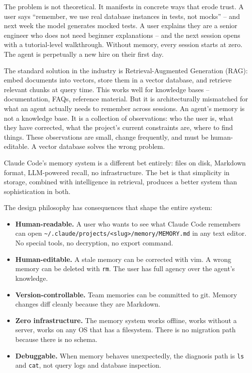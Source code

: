 \documentclass[
  english,
  11pt,
  letterpaper,
]{book}
\providecommand{\tightlist}{%
  \setlength{\itemsep}{0pt}\setlength{\parskip}{0pt}}
\begin{document}
The problem is not theoretical. It manifests in concrete ways that erode
trust. A user says ``remember, we use real database instances in tests,
not mocks'' -- and next week the model generates mocked tests. A user
explains they are a senior engineer who does not need beginner
explanations -- and the next session opens with a tutorial-level
walkthrough. Without memory, every session starts at zero. The agent is
perpetually a new hire on their first day.

The standard solution in the industry is Retrieval-Augmented Generation
(RAG): embed documents into vectors, store them in a vector database,
and retrieve relevant chunks at query time. This works well for
knowledge bases -- documentation, FAQs, reference material. But it is
architecturally mismatched for what an agent actually needs to remember
across sessions. An agent's memory is not a knowledge base. It is a
collection of observations: who the user is, what they have corrected,
what the project's current constraints are, where to find things. These
observations are small, change frequently, and must be human-editable. A
vector database solves the wrong problem.

Claude Code's memory system is a different bet entirely: files on disk,
Markdown format, LLM-powered recall, no infrastructure. The bet is that
simplicity in storage, combined with intelligence in retrieval, produces
a better system than sophistication in both.

The design philosophy has consequences that shape the entire system:

\begin{itemize}
\tightlist
\item
  \textbf{Human-readable.} A user who wants to see what Claude Code
  remembers can open
  \texttt{\textasciitilde{}/.claude/projects/\textless{}slug\textgreater{}/memory/MEMORY.md}
  in any text editor. No special tools, no decryption, no export
  command.
\item
  \textbf{Human-editable.} A stale memory can be corrected with vim. A
  wrong memory can be deleted with \texttt{rm}. The user has full agency
  over the agent's knowledge.
\item
  \textbf{Version-controllable.} Team memories can be committed to git.
  Memory changes diff cleanly because they are Markdown.
\item
  \textbf{Zero infrastructure.} The memory system works offline, works
  without a server, works on any OS that has a filesystem. There is no
  migration path because there is no schema.
\item
  \textbf{Debuggable.} When memory behaves unexpectedly, the diagnosis
  path is \texttt{ls} and \texttt{cat}, not query logs and database
  inspection.
\end{itemize}
\end{document}
